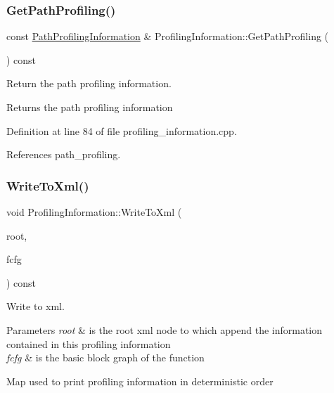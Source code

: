 \subsubsection{\texorpdfstring{Get\+Path\+Profiling()}{GetPathProfiling()}}
{\footnotesize\ttfamily const \hyperlink{classPathProfilingInformation}{Path\+Profiling\+Information} \& Profiling\+Information\+::\+Get\+Path\+Profiling (\begin{DoxyParamCaption}{ }\end{DoxyParamCaption}) const}



Return the path profiling information. 

\begin{DoxyReturn}{Returns}
the path profiling information 
\end{DoxyReturn}


Definition at line 84 of file profiling\+\_\+information.\+cpp.



References path\+\_\+profiling.

\mbox{\label{classProfilingInformation_a375a5ce9e10012e523afa9514fb95e89}} 
\subsubsection{\texorpdfstring{Write\+To\+Xml()}{WriteToXml()}}
{\footnotesize\ttfamily void Profiling\+Information\+::\+Write\+To\+Xml (\begin{DoxyParamCaption}\item[{\hyperlink{classxml__element}{xml\+\_\+element} $\ast$}]{root,  }\item[{const \hyperlink{basic__block_8hpp_ab66bdbde3a29e41d079d8a320af9c921}{B\+B\+Graph\+Const\+Ref}}]{fcfg }\end{DoxyParamCaption}) const}



Write to xml. 


\begin{DoxyParams}{Parameters}
{\em root} & is the root xml node to which append the information contained in this profiling information \\
\hline
{\em fcfg} & is the basic block graph of the function \\
\hline
\end{DoxyParams}
Map used to print profiling information in deterministic order

